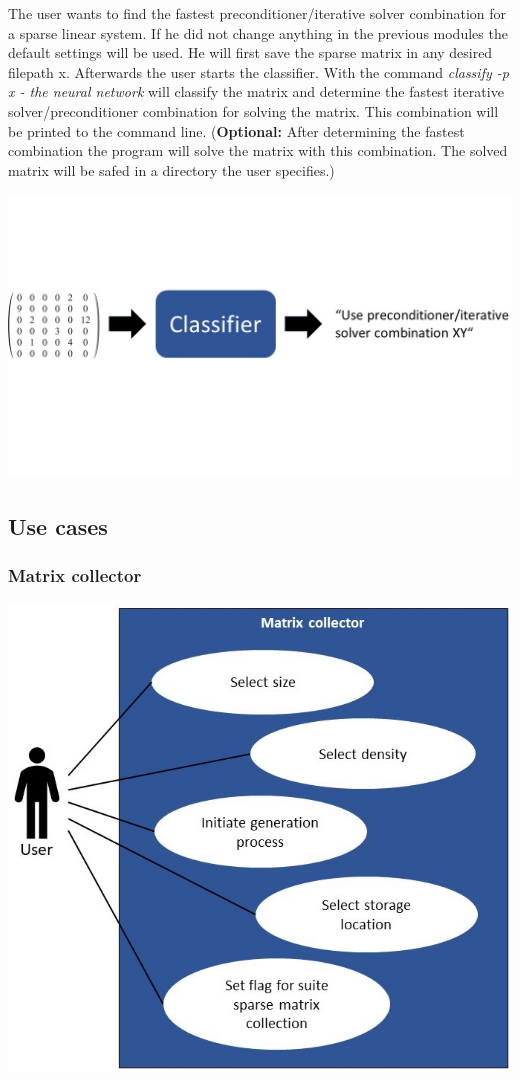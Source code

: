 \documentclass[parskip=full]{scrartcl}
\begin{document}
The user wants to find the fastest \gls{preconditioner}/\gls{iterative solver} combination for a sparse linear system. If he did not change anything in the previous modules the default settings will be used. He will first save the sparse matrix in any desired filepath x. Afterwards the user starts the \gls{classifier}.
With the command \textit{classify  -p x - the \gls{neural network}} will classify the matrix and determine the fastest \gls{iterative solver}/\gls{preconditioner} combination for solving the matrix. This combination will be printed to the command line. (\textbf{Optional:} After determining the fastest combination the program will solve the matrix with this combination. The solved matrix will be safed in a directory the user specifies.)
\begin{center}
\includegraphics[width=\textwidth]{classifier}
\end{center}

\subsection{Use cases}
\subsubsection{Matrix \gls{collector}}
\includegraphics[width=1\textwidth]{useCase_collector_scaled}
\end{document}
